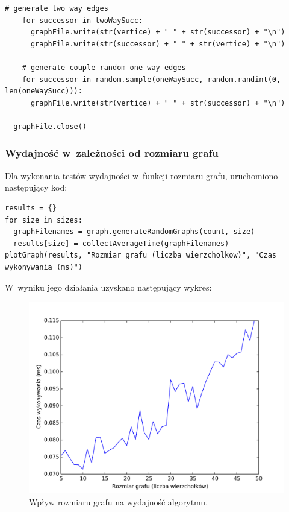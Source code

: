 \documentclass[11pt,a4paper]{article}
\begin{document}
\begin{lstlisting}[caption = Funkcje generujące grafy dla testów wydajnościowych]
    # generate two way edges
    for successor in twoWaySucc:
      graphFile.write(str(vertice) + " " + str(successor) + "\n")
      graphFile.write(str(successor) + " " + str(vertice) + "\n")

    # generate couple random one-way edges
    for successor in random.sample(oneWaySucc, random.randint(0, len(oneWaySucc))):
      graphFile.write(str(vertice) + " " + str(successor) + "\n")

  graphFile.close()
\end{lstlisting}

\newpage
\subsubsection{Wydajność w~zależności od rozmiaru grafu}
Dla wykonania testów wydajności w~funkcji rozmiaru grafu, uruchomiono następujący kod:\\

\begin{lstlisting}[caption = Testy wydajności w~zależności od rozmiaru grafu]
results = {}
for size in sizes:
  graphFilenames = graph.generateRandomGraphs(count, size)
  results[size] = collectAverageTime(graphFilenames)
plotGraph(results, "Rozmiar grafu (liczba wierzcholkow)", "Czas wykonywania (ms)")
\end{lstlisting}

W~wyniku jego działania uzyskano następujący wykres:

\begin{figure}[H]
\includegraphics[trim = 0mm 2mm 0mm 12mm, clip, width=14cm]{img/size.pdf}
\caption{Wpływ rozmiaru grafu na wydajność algorytmu.}
\end{figure}
\end{document}

